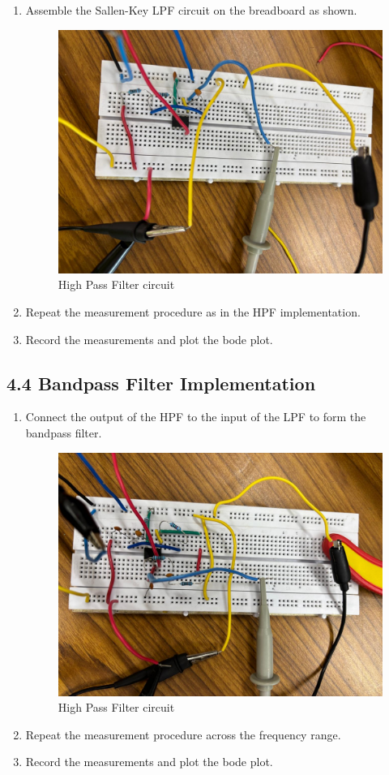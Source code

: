 \documentclass{article}
\begin{document}
\begin{enumerate}
\item Assemble the Sallen-Key LPF circuit on the breadboard as shown.
\begin{figure}[h!]
    \centering
    \includegraphics[width=0.7\linewidth]{figs/lowpass_circuit.jpeg}
    \caption{High Pass Filter circuit}
    \label{fig:enter-label}
\end{figure}
\pagebreak
\item Repeat the measurement procedure as in the HPF implementation.
\item Record the measurements and plot the bode plot.
\end{enumerate}

\subsection*{4.4 Bandpass Filter Implementation}

\begin{enumerate}
\item Connect the output of the HPF to the input of the LPF to form the bandpass filter.
\begin{figure}[h!]
    \centering
    \includegraphics[width=0.7\linewidth]{figs/bandpass_circuit.jpeg}
    \caption{High Pass Filter circuit}
    \label{fig:enter-label}
\end{figure}
\pagebreak
\item Repeat the measurement procedure across the frequency range.
\item Record the measurements and plot the bode plot.
\end{enumerate}
\end{document}

